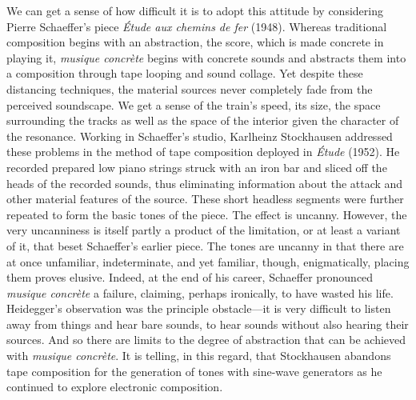 We can get a sense of how difficult it is to adopt this attitude by considering Pierre Schaeffer's piece \emph{Étude aux chemins de fer} (1948). Whereas traditional composition begins with an abstraction, the score, which is made concrete in playing it, \emph{musique concrète} begins with concrete sounds and abstracts them into a composition through tape looping and sound collage. Yet despite these distancing techniques, the material sources never completely fade from the perceived soundscape. We get a sense of the train's speed, its size, the space surrounding the tracks as well as the space of the interior given the character of the resonance. Working in Schaeffer's studio, Karlheinz Stockhausen addressed these problems in the method of tape composition deployed in \emph{Étude} (1952). He recorded prepared low piano strings struck with an iron bar and sliced off the heads of the recorded sounds, thus eliminating information about the attack and other material features of the source. These short headless segments were further repeated to form the basic tones of the piece. The effect is uncanny. However, the very uncanniness is itself partly a product of the limitation, or at least a variant of it, that beset Schaeffer's earlier piece. The tones are uncanny in that there are at once unfamiliar, indeterminate, and yet familiar, though, enigmatically, placing them proves elusive. Indeed, at the end of his career, Schaeffer pronounced \emph{musique concrète} a failure, claiming, perhaps ironically, to have wasted his life. Heidegger's observation was the principle obstacle---it is very difficult to listen away from things and hear bare sounds, to hear sounds without also hearing their sources. And so there are limits to the degree of abstraction that can be achieved with \emph{musique concrète}. It is telling, in this regard, that Stockhausen abandons tape composition for the generation of tones with sine-wave generators as he continued to explore electronic composition.

